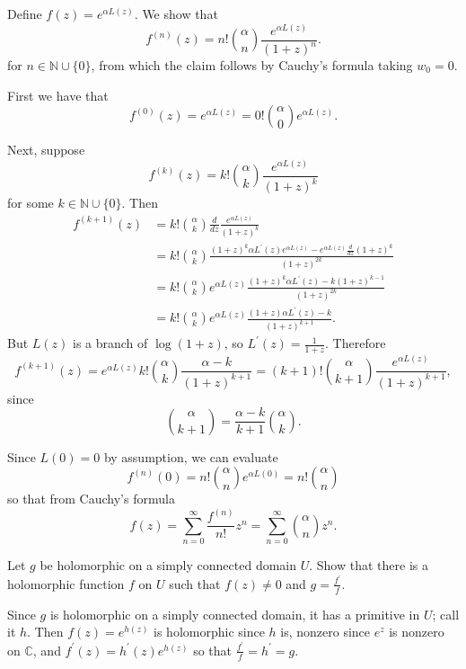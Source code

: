 \documentclass{article}
\newcounter{Problem}
\newenvironment{Problem}{\begin{Exercise}[name={Problem},
                                          counter={Problem}]}
                        {\end{Exercise}}
\begin{document}
\begin{Answer}
Define $f(z) = e^{\alpha L(z)}$. We show that
$$
f^{(n)}(z) = n! {\alpha \choose n} \frac{e^{\alpha L(z)}}{(1 + z)^n}.
$$
for $n \in \mathbb{N} \cup \{0\}$, from which the claim follows by
Cauchy's formula taking $w_0 = 0$.

First we have that
$$
  f^{(0)}(z) 
= e^{\alpha L(z)}
= 0! {\alpha \choose 0} e^{\alpha L(z)}.
$$

Next, suppose 
$$
f^{(k)}(z) = k! {\alpha \choose k} \frac{e^{\alpha L(z)}}{(1 + z)^k}
$$
for some $k \in \mathbb{N} \cup \{ 0 \}$. Then
\begin{align*}
   f^{(k+1)}(z)
&= k! {\alpha \choose k}
   \frac{d}{dz}
   \frac{e^{\alpha L(z)}}{(1 + z)^k} \\
&= k! {\alpha \choose k}
   \frac{ (1 + z)^k \alpha L^\prime(z) e^{\alpha L(z)}
        - e^{\alpha L(z)} \frac{d}{dz} (1 + z)^k     
   }
   {(1 + z)^{2k}} \\
&= k! {\alpha \choose k}
   e^{\alpha L(z)}
   \frac{(1 + z)^k \alpha L^{\prime}(z) - k (1 + z)^{k-1}}
        {(1 + z)^{2k}} \\
&= k! {\alpha \choose k}
   e^{\alpha L(z)}
   \frac{(1 + z) \alpha L^\prime(z) - k}{(1 + z)^{k + 1}}.
\end{align*}
But $L(z)$ is a branch of $\log (1 + z)$, so $L^\prime(z) = \frac{1}{1 + z}$.
Therefore
$$
  f^{(k+1)}(z) 
= e^{\alpha L(z)} k!
  {\alpha \choose k}
  \frac{\alpha - k}{(1 + z)^{k+1}}
= (k + 1)! {\alpha \choose k + 1} \frac{e^{\alpha L(z)}}{(1 + z)^{k+1}},
$$
since
$$
  {\alpha \choose k + 1} 
= \frac{\alpha - k}{k+1} {\alpha \choose k}.
$$

Since $L(0) = 0$ by assumption, we can evaluate
$$
  f^{(n)}(0) 
= n! {\alpha \choose n} e^{\alpha L(0)}
= n! {\alpha \choose n}
$$
so that from Cauchy's formula
$$
  f(z)
= \sum_{n=0}^\infty \frac{f^{(n)}}{n!} z^n
= \sum_{n=0}^\infty {\alpha \choose n} z^n.
$$

\end{Answer}

\begin{Problem}
Let $g$ be holomorphic on a simply connected domain $U$. Show that there is a
holomorphic function $f$ on $U$ such that $f(z) \neq 0$ and
$g = \frac{f^\prime}{f}$.
\end{Problem}

Since $g$ is holomorphic on a simply connected domain, it has a primitive in
$U$; call it $h$. Then $f(z) = e^{h(z)}$ is holomorphic since $h$ is,
nonzero since $e^z$ is nonzero on $\mathbb{C}$, and
$f^\prime(z) = h^\prime(z) e^{h(z)}$ so that $\frac{f^\prime}{f} = h^\prime = g$.
\end{document}
